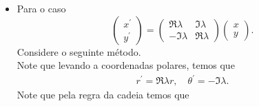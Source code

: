 \begin{homeworkProblem}[1-23]
\begin{solution}
\begin{itemize}
\begin{equation}
\begin{pmatrix}
          1 & \lambda
        \end{pmatrix}\begin{pmatrix}
          x \\
          y
        \end{pmatrix}.
      \end{equation}
      Considere o seguinte método.\\
      Note que pela regra da cadeia temos que
      \begin{align*}
        \frac{dy}{dx}=\frac{y^{\prime}}{x^{\prime}}=\frac{x+\lambda y}{\lambda x}.
      \end{align*}
      Logo, usando o fator integrante $e^{\int-\frac{1}{x}\,dx}=\frac{1}{x}$, podemos garantir que a sua solução é
      \begin{align*}
        \frac{y}{x}-\frac{\ln(|x|)}{\lambda}=c.
      \end{align*}
      Assim, defina
      \begin{align*}
        H(x,y)=\frac{y}{x}-\frac{\ln(|x|)}{\lambda}.
      \end{align*}
      Logo temos que se $(x,y)$ é solução de \eqref{eq:1-23-caso2}, então
      \begin{align*}
        H(x,y)=\frac{y}{x}-\frac{\ln(|x|)}{\lambda}=0.
      \end{align*}
      Isto é que $H$ é integral primeira de $A$.
    \item Para o caso
      \begin{equation}\label{eq:1-23-caso3}
        \begin{pmatrix}
          x^{\prime} \\
          y^{\prime}
        \end{pmatrix}=\begin{pmatrix}
          \Re \lambda & \Im \lambda \\
          -\Im \lambda & \Re \lambda
        \end{pmatrix}\begin{pmatrix}
          x \\
          y
        \end{pmatrix}.
      \end{equation}
      Considere o seguinte método.\\
      Note que levando a coordenadas polares, temos que
      \begin{align*}
        r^{\prime}=\Re\lambda r,\quad \theta^{\prime}=-\Im\lambda.
      \end{align*}
      Note que pela regra da cadeia temos que

\end{itemize}
\end{solution}
\end{homeworkProblem}
